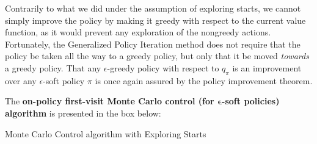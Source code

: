Contrarily to what we did under the assumption of exploring starts, we cannot simply improve the policy by making it greedy with respect to the current value function, as it would prevent any exploration of the nongreedy actions. Fortunately, the Generalized Policy Iteration method does not require that the policy be taken all the way to a greedy policy, but only that it be moved \textit{towards} a greedy policy. That any $\epsilon$-greedy policy with respect to $q_\pi$ is an improvement over any $\epsilon$-soft policy $\pi$ is once again assured by the policy improvement theorem.

The \textbf{on-policy first-visit Monte Carlo control (for $\boldsymbol{\epsilon}$-soft policies) algorithm} is presented in the box below:

\begin{algorithm}[H]
\SetAlgoLined
{}

 \caption{Monte Carlo Control algorithm with Exploring Starts}
\end{algorithm}